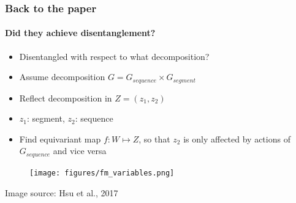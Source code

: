 \documentclass[9pt]{beamer}
\begin{document}





\begin{frame}
\frametitle{Back to the paper}
\framesubtitle{Did they achieve disentanglement?}
\begin{itemize}
	\item Disentangled with respect to what decomposition?
	\item Assume decomposition $G = G_{sequence} \times G_{segment}$
	\item Reflect decomposition in $Z= (z_1, z_2)$
	\item $z_1$: segment, $z_2$: sequence
	\item Find equivariant map $f:W\mapsto Z$, so that $z_2$ is only affected by actions of $G_{sequence}$ and vice versa
\end{itemize}
\begin{figure}
	\texttt{[image: figures/fm\_variables.png]}
\end{figure}
\begin{tiny}
	Image source: Hsu et al., 2017 
\end{tiny}
\end{frame} 
\end{document}
